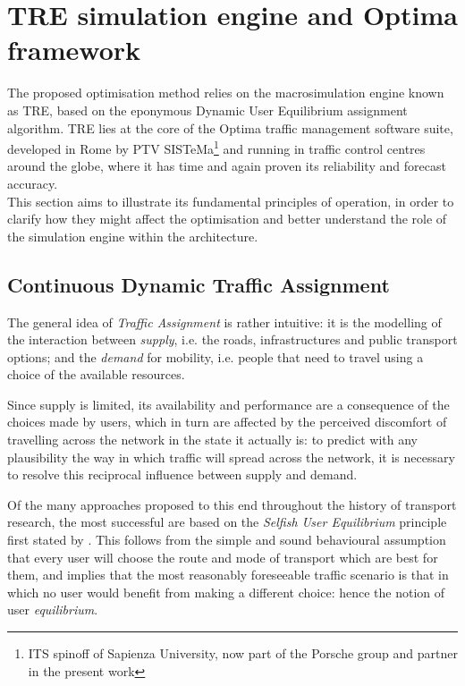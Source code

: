 \section{TRE simulation engine and Optima framework}
The proposed optimisation method relies on the macrosimulation engine known as TRE, based on the eponymous Dynamic User Equilibrium assignment algorithm.
TRE lies at the core of the Optima traffic management software suite, developed in Rome by PTV SISTeMa\footnote{ITS spinoff of Sapienza University, now part of the Porsche group and partner in the present work } and running in traffic control centres around the globe, where it has time and again proven its reliability and forecast accuracy.\\
This section aims to illustrate its fundamental principles of operation, in order to clarify how they might affect the optimisation and better understand the role of the simulation engine within the architecture.

\subsection{Continuous Dynamic Traffic Assignment}
The general idea of \emph{Traffic Assignment} is rather intuitive: it is the modelling of the interaction between \emph{supply}, i.e. the roads, infrastructures and public transport options; and the \emph{demand} for mobility, i.e. people that need to travel using a choice of the available resources.

Since supply is limited, its availability and performance are a consequence of the choices made by users, which in turn are affected by the perceived discomfort of travelling across the network in the state it actually is: to predict with any plausibility the way in which traffic will spread across the network, it is necessary to resolve this reciprocal influence between supply and demand.

Of the many approaches proposed to this end throughout the history of transport research, the most successful are based on the \emph{Selfish User Equilibrium} principle first stated by \cite{wardrop1952}. This follows from the simple and sound behavioural assumption that every user will choose the route and mode of transport which are best for them, and implies that the most reasonably foreseeable traffic scenario is that in which no user would benefit from making a different choice: hence the notion of user \emph{equilibrium}.


